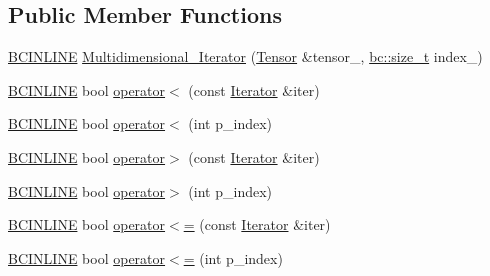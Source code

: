 \subsection*{Public Member Functions}
\begin{DoxyCompactItemize}
\item 
\hyperlink{common_8h_a6699e8b0449da5c0fafb878e59c1d4b1}{B\+C\+I\+N\+L\+I\+NE} \hyperlink{structbc_1_1tensors_1_1iterators_1_1Multidimensional__Iterator_ad1a73829a7e3eb32ef92915377d0b061}{Multidimensional\+\_\+\+Iterator} (\hyperlink{namespacebc_a659391e47ab612be3ba6c18cf9c89159}{Tensor} \&tensor\+\_\+, \hyperlink{namespacebc_aaf8e3fbf99b04b1b57c4f80c6f55d3c5}{bc\+::size\+\_\+t} index\+\_)
\item 
\hyperlink{common_8h_a6699e8b0449da5c0fafb878e59c1d4b1}{B\+C\+I\+N\+L\+I\+NE} bool \hyperlink{structbc_1_1tensors_1_1iterators_1_1Multidimensional__Iterator_a3ba7c23b9d6ef1db03005f86577d44a2}{operator$<$} (const \hyperlink{structbc_1_1tensors_1_1iterators_1_1Multidimensional__Iterator_a12d78eb95b3b0fbee7c824f0a79c1513}{Iterator} \&iter)
\item 
\hyperlink{common_8h_a6699e8b0449da5c0fafb878e59c1d4b1}{B\+C\+I\+N\+L\+I\+NE} bool \hyperlink{structbc_1_1tensors_1_1iterators_1_1Multidimensional__Iterator_a69caddf233012cda5fcb564ab705d746}{operator$<$} (int p\+\_\+index)
\item 
\hyperlink{common_8h_a6699e8b0449da5c0fafb878e59c1d4b1}{B\+C\+I\+N\+L\+I\+NE} bool \hyperlink{structbc_1_1tensors_1_1iterators_1_1Multidimensional__Iterator_a8d7f58b99901c4a98a49b556a66284bc}{operator$>$} (const \hyperlink{structbc_1_1tensors_1_1iterators_1_1Multidimensional__Iterator_a12d78eb95b3b0fbee7c824f0a79c1513}{Iterator} \&iter)
\item 
\hyperlink{common_8h_a6699e8b0449da5c0fafb878e59c1d4b1}{B\+C\+I\+N\+L\+I\+NE} bool \hyperlink{structbc_1_1tensors_1_1iterators_1_1Multidimensional__Iterator_af6b26c5e1e7616d5e69ab1ee6bb5eb62}{operator$>$} (int p\+\_\+index)
\item 
\hyperlink{common_8h_a6699e8b0449da5c0fafb878e59c1d4b1}{B\+C\+I\+N\+L\+I\+NE} bool \hyperlink{structbc_1_1tensors_1_1iterators_1_1Multidimensional__Iterator_a24cc26f559cac21831f96621623263f5}{operator$<$=} (const \hyperlink{structbc_1_1tensors_1_1iterators_1_1Multidimensional__Iterator_a12d78eb95b3b0fbee7c824f0a79c1513}{Iterator} \&iter)
\item 
\hyperlink{common_8h_a6699e8b0449da5c0fafb878e59c1d4b1}{B\+C\+I\+N\+L\+I\+NE} bool \hyperlink{structbc_1_1tensors_1_1iterators_1_1Multidimensional__Iterator_a4b18ef5219534e2fa93959c3bb829346}{operator$<$=} (int p\+\_\+index)

\end{DoxyCompactItemize}
